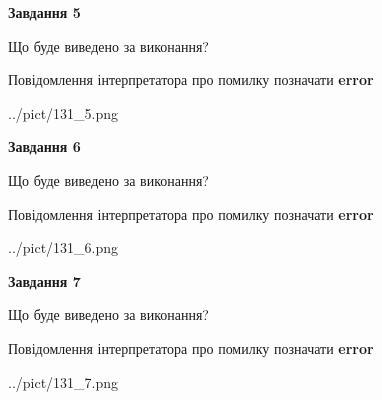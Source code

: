 \documentclass[10pt, ukrainian]{article}
\begin{document}
{\begin {large}
{\begin {center}\textbf{Завдання 5}\end {center}}\par
Що буде виведено за виконання? \par
Повідомлення інтерпретатора про помилку позначати \textbf{error}

\begin{center}
	{../pict/131_5.png}
\end{center}
\newpage

{\begin {center}\textbf{Завдання 6}\end {center}}\par
Що буде виведено за виконання? \par
Повідомлення інтерпретатора про помилку позначати \textbf{error}

\begin{center}
	{../pict/131_6.png}
\end{center}
\newpage

{\begin {center}\textbf{Завдання 7}\end {center}}\par
Що буде виведено за виконання? \par
Повідомлення інтерпретатора про помилку позначати \textbf{error}

\begin{center}
	{../pict/131_7.png}
\end{center}
\newpage

\end {large}}
\end{document}
